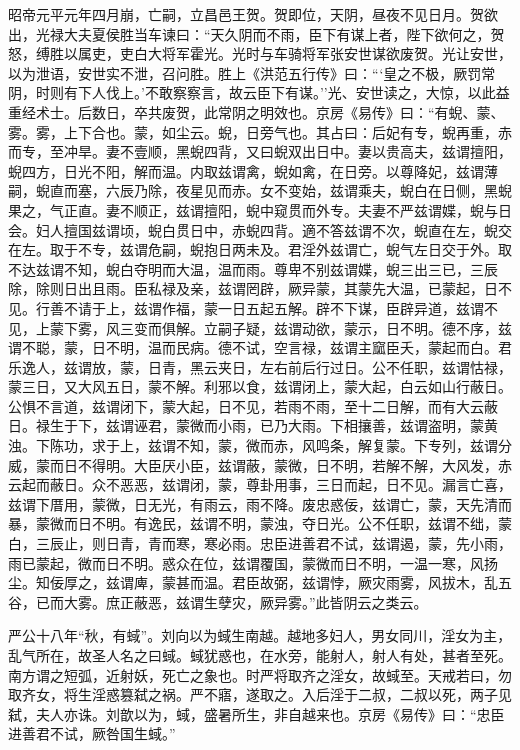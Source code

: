 \documentclass[]{article}
\begin{document}
昭帝元平元年四月崩，亡嗣，立昌邑王贺。贺即位，天阴，昼夜不见日月。贺欲出，光禄大夫夏侯胜当车谏曰：``天久阴而不雨，臣下有谋上者，陛下欲何之，贺怒，缚胜以属吏，吏白大将军霍光。光时与车骑将军张安世谋欲废贺。光让安世，以为泄语，安世实不泄，召问胜。胜上《洪范五行传》曰：```皇之不极，厥罚常阴，时则有下人伐上。'不敢察察言，故云臣下有谋。''光、安世读之，大惊，以此益重经术士。后数日，卒共废贺，此常阴之明效也。京房《易传》曰：``有蜺、蒙、雾。雾，上下合也。蒙，如尘云。蜺，日旁气也。其占曰：后妃有专，蜺再重，赤而专，至冲旱。妻不壹顺，黑蜺四背，又曰蜺双出日中。妻以贵高夫，兹谓擅阳，蜺四方，日光不阳，解而温。内取兹谓禽，蜺如禽，在日旁。以尊降妃，兹谓薄嗣，蜺直而塞，六辰乃除，夜星见而赤。女不变始，兹谓乘夫，蜺白在日侧，黑蜺果之，气正直。妻不顺正，兹谓擅阳，蜺中窥贯而外专。夫妻不严兹谓媟，蜺与日会。妇人擅国兹谓顷，蜺白贯日中，赤蜺四背。適不答兹谓不次，蜺直在左，蜺交在左。取于不专，兹谓危嗣，蜺抱日两未及。君淫外兹谓亡，蜺气左日交于外。取不达兹谓不知，蜺白夺明而大温，温而雨。尊卑不别兹谓媟，蜺三出三已，三辰除，除则日出且雨。臣私禄及亲，兹谓罔辟，厥异蒙，其蒙先大温，已蒙起，日不见。行善不请于上，兹谓作福，蒙一日五起五解。辟不下谋，臣辟异道，兹谓不见，上蒙下雾，风三变而俱解。立嗣子疑，兹谓动欲，蒙示，日不明。德不序，兹谓不聪，蒙，日不明，温而民病。德不试，空言禄，兹谓主窳臣夭，蒙起而白。君乐逸人，兹谓放，蒙，日青，黑云夹日，左右前后行过日。公不任职，兹谓怙禄，蒙三日，又大风五日，蒙不解。利邪以食，兹谓闭上，蒙大起，白云如山行蔽日。公惧不言道，兹谓闭下，蒙大起，日不见，若雨不雨，至十二日解，而有大云蔽日。禄生于下，兹谓诬君，蒙微而小雨，已乃大雨。下相攘善，兹谓盗明，蒙黄浊。下陈功，求于上，兹谓不知，蒙，微而赤，风鸣条，解复蒙。下专列，兹谓分威，蒙而日不得明。大臣厌小臣，兹谓蔽，蒙微，日不明，若解不解，大风发，赤云起而蔽日。众不恶恶，兹谓闭，蒙，尊卦用事，三日而起，日不见。漏言亡喜，兹谓下厝用，蒙微，日无光，有雨云，雨不降。废忠惑佞，兹谓亡，蒙，天先清而暴，蒙微而日不明。有逸民，兹谓不明，蒙浊，夺日光。公不任职，兹谓不绌，蒙白，三辰止，则日青，青而寒，寒必雨。忠臣进善君不试，兹谓遏，蒙，先小雨，雨已蒙起，微而日不明。惑众在位，兹谓覆国，蒙微而日不明，一温一寒，风扬尘。知佞厚之，兹谓庳，蒙甚而温。君臣故弼，兹谓悖，厥灾雨雾，风拔木，乱五谷，已而大雾。庶正蔽恶，兹谓生孽灾，厥异雾。''此皆阴云之类云。

严公十八年``秋，有蜮''。刘向以为蜮生南越。越地多妇人，男女同川，淫女为主，乱气所在，故圣人名之曰蜮。蜮犹惑也，在水旁，能射人，射人有处，甚者至死。南方谓之短弧，近射妖，死亡之象也。时严将取齐之淫女，故蜮至。天戒若曰，勿取齐女，将生淫惑篡弑之祸。严不寤，遂取之。入后淫于二叔，二叔以死，两子见弑，夫人亦诛。刘歆以为，蜮，盛暑所生，非自越来也。京房《易传》曰：``忠臣进善君不试，厥咎国生蜮。''
\end{document}
